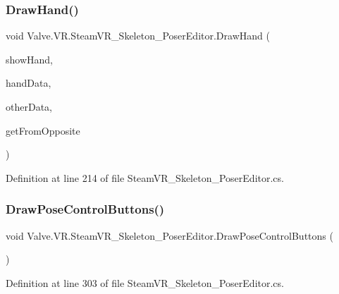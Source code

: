 \subsubsection{\texorpdfstring{DrawHand()}{DrawHand()}}
{\footnotesize\ttfamily void Valve.\+V\+R.\+Steam\+V\+R\+\_\+\+Skeleton\+\_\+\+Poser\+Editor.\+Draw\+Hand (\begin{DoxyParamCaption}\item[{bool}]{show\+Hand,  }\item[{\mbox{\hyperlink{class_valve_1_1_v_r_1_1_steam_v_r___skeleton___pose___hand}{Steam\+V\+R\+\_\+\+Skeleton\+\_\+\+Pose\+\_\+\+Hand}}}]{hand\+Data,  }\item[{\mbox{\hyperlink{class_valve_1_1_v_r_1_1_steam_v_r___skeleton___pose___hand}{Steam\+V\+R\+\_\+\+Skeleton\+\_\+\+Pose\+\_\+\+Hand}}}]{other\+Data,  }\item[{bool}]{get\+From\+Opposite }\end{DoxyParamCaption})\hspace{0.3cm}{\ttfamily [protected]}}



Definition at line 214 of file Steam\+V\+R\+\_\+\+Skeleton\+\_\+\+Poser\+Editor.\+cs.

\mbox{\label{class_valve_1_1_v_r_1_1_steam_v_r___skeleton___poser_editor_ad760db10fd1db4bab002914de2dc225d}} 
\subsubsection{\texorpdfstring{DrawPoseControlButtons()}{DrawPoseControlButtons()}}
{\footnotesize\ttfamily void Valve.\+V\+R.\+Steam\+V\+R\+\_\+\+Skeleton\+\_\+\+Poser\+Editor.\+Draw\+Pose\+Control\+Buttons (\begin{DoxyParamCaption}{ }\end{DoxyParamCaption})\hspace{0.3cm}{\ttfamily [protected]}}



Definition at line 303 of file Steam\+V\+R\+\_\+\+Skeleton\+\_\+\+Poser\+Editor.\+cs.

\mbox{\label{class_valve_1_1_v_r_1_1_steam_v_r___skeleton___poser_editor_a2a4a82a8af4635de9f55c622235ac9b3}} 
